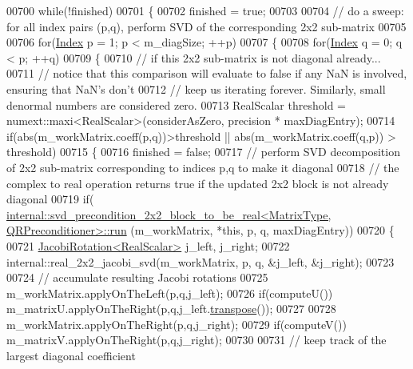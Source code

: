 \begin{DoxyCode}
00700   \textcolor{keywordflow}{while}(!finished)
00701   \{
00702     finished = \textcolor{keyword}{true};
00703 
00704     \textcolor{comment}{// do a sweep: for all index pairs (p,q), perform SVD of the corresponding 2x2 sub-matrix}
00705 
00706     \textcolor{keywordflow}{for}(\hyperlink{group___s_v_d___module_a6229a37997eca1072b52cca5ee7a2bec}{Index} p = 1; p < m\_diagSize; ++p)
00707     \{
00708       \textcolor{keywordflow}{for}(\hyperlink{group___s_v_d___module_a6229a37997eca1072b52cca5ee7a2bec}{Index} q = 0; q < p; ++q)
00709       \{
00710         \textcolor{comment}{// if this 2x2 sub-matrix is not diagonal already...}
00711         \textcolor{comment}{// notice that this comparison will evaluate to false if any NaN is involved, ensuring that NaN's
       don't}
00712         \textcolor{comment}{// keep us iterating forever. Similarly, small denormal numbers are considered zero.}
00713         RealScalar threshold = numext::maxi<RealScalar>(considerAsZero, precision * maxDiagEntry);
00714         \textcolor{keywordflow}{if}(abs(m\_workMatrix.coeff(p,q))>threshold || abs(m\_workMatrix.coeff(q,p)) > threshold)
00715         \{
00716           finished = \textcolor{keyword}{false};
00717           \textcolor{comment}{// perform SVD decomposition of 2x2 sub-matrix corresponding to indices p,q to make it diagonal}
00718           \textcolor{comment}{// the complex to real operation returns true if the updated 2x2 block is not already diagonal}
00719           \textcolor{keywordflow}{if}(
      \hyperlink{struct_eigen_1_1internal_1_1svd__precondition__2x2__block__to__be__real}{internal::svd\_precondition\_2x2\_block\_to\_be\_real<MatrixType, QRPreconditioner>::run}
      (m\_workMatrix, *\textcolor{keyword}{this}, p, q, maxDiagEntry))
00720           \{
00721             \hyperlink{group___jacobi___module_class_eigen_1_1_jacobi_rotation}{JacobiRotation<RealScalar>} j\_left, j\_right;
00722             internal::real\_2x2\_jacobi\_svd(m\_workMatrix, p, q, &j\_left, &j\_right);
00723 
00724             \textcolor{comment}{// accumulate resulting Jacobi rotations}
00725             m\_workMatrix.applyOnTheLeft(p,q,j\_left);
00726             \textcolor{keywordflow}{if}(computeU()) m\_matrixU.applyOnTheRight(p,q,j\_left.\hyperlink{group___jacobi___module_ab40e9cdc4582593511e57ee896e055a2}{transpose}());
00727 
00728             m\_workMatrix.applyOnTheRight(p,q,j\_right);
00729             \textcolor{keywordflow}{if}(computeV()) m\_matrixV.applyOnTheRight(p,q,j\_right);
00730 
00731             \textcolor{comment}{// keep track of the largest diagonal coefficient}

\end{DoxyCode}
